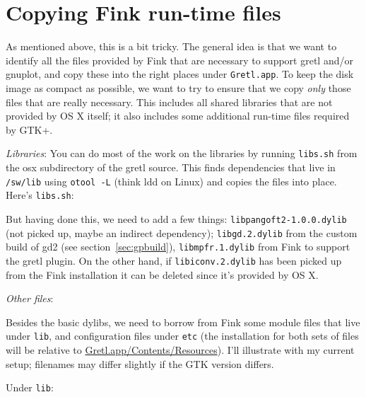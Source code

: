 \documentclass{article}
\begin{document}
\section{Copying Fink run-time files}

As mentioned above, this is a bit tricky.  The general idea is that we
want to identify all the files provided by Fink that are necessary to
support gretl and/or gnuplot, and copy these into the right places
under \texttt{Gretl.app}.  To keep the disk image as compact as
possible, we want to try to ensure that we copy \textit{only} those
files that are really necessary.  This includes all shared libraries
that are not provided by OS X itself; it also includes some additional
run-time files required by GTK+.

\textit{Libraries}: You can do most of the work on the libraries by
running \texttt{libs.sh} from the osx subdirectory of the gretl
source.  This finds dependencies that live in \texttt{/sw/lib} using
\texttt{otool -L} (think ldd on Linux) and copies the files
into place. Here's \texttt{libs.sh}:


But having done this, we need to add a few things:
\texttt{libpangoft2-1.0.0.dylib} (not picked up, maybe an indirect
dependency); \texttt{libgd.2.dylib} from the custom build of gd2 (see
section~\ref{sec:gpbuild}), \texttt{libmpfr.1.dylib} from Fink to
support the gretl plugin.  On the other hand, if
\texttt{libiconv.2.dylib} has been picked up from the Fink
installation it can be deleted since it's provided by OS X.

\textit{Other files}: 

Besides the basic dylibs, we need to borrow from Fink some module
files that live under \texttt{lib}, and configuration files under
\texttt{etc} (the installation for both sets of files will be relative
to \url{Gretl.app/Contents/Resources}).  I'll illustrate with my
current setup; filenames may differ slightly if the GTK version
differs.

Under \texttt{lib}:
\end{document}
